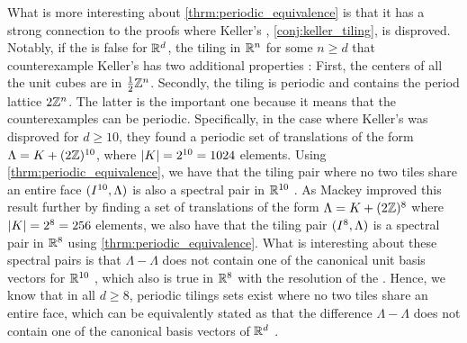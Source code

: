 \documentclass[../thesis.tex]{subfiles}
\begin{document}
What is more interesting about \cref{thrm:periodic_equivalence} is that it has a strong connection to the proofs where Keller's , \cref{conj:keller_tiling}, is disproved. Notably, if the  is false for $\mathbb{R}^d$, the tiling in $\mathbb{R}^n$ for some $n\geq d$ that counterexample Keller's  has two additional properties \cite{lagariasKellerCubetilingConjecture1992}: First, the centers of all the unit cubes are in $\frac{1}{2}\mathbb{Z}^n$. Secondly, the tiling is periodic and contains the period lattice $2\mathbb{Z}^n$. The latter is the important one because it means that the counterexamples can be periodic. Specifically, in the case where Keller's  was disproved for $d\geq10$, they found a periodic set of translations of the form $\Lambda= K + (2\mathbb{Z})^{10}$, where $|K| = 2^{10} = 1024$ elements. Using \cref{thrm:periodic_equivalence}, we have that the tiling pair where no two tiles share an entire face $(I^{10},\Lambda)$ is also a spectral pair in $\mathbb{R}^{10}$ \cite{jorgensenSpectralPairsCartesian2001}. As Mackey \cite{mackeyCubeTilingDimension2002} improved this result further by finding a set of translations of the form $\Lambda= K + (2\mathbb{Z})^{8}$ where $|K| = 2^{8} = 256$ elements, we also have that the tiling pair $(I^{8},\Lambda)$ is a spectral pair in $\mathbb{R}^8$ using \cref{thrm:periodic_equivalence}. What is interesting about these spectral pairs is that $\Lambda-\Lambda$ does not contain one of the canonical unit basis vectors for $\mathbb{R}^{10}$ \cite{jorgensenSpectralPairsCartesian2001}, which also is true in $\mathbb{R}^{8}$ with the resolution of the  \cite{brakensiekResolutionKellerConjecture2020}. Hence, we know that in all $d\geq8$, periodic tilings sets exist where no two tiles share an entire face, which can be equivalently stated as that the difference $\Lambda-\Lambda$ does not contain one of the canonical basis vectors of $\mathbb{R}^d$ \cite{jorgensenSpectralPairsCartesian2001}.
\end{document}
